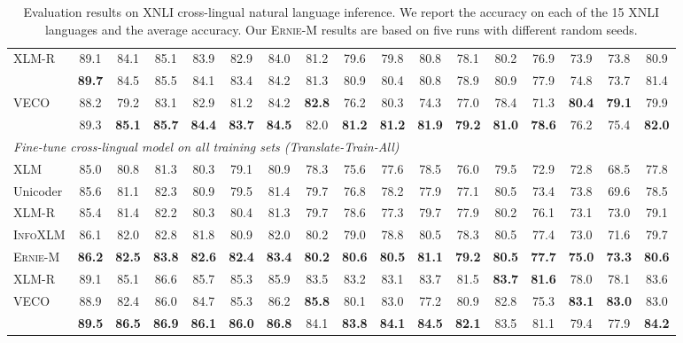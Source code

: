 \documentclass[11pt]{article}
\begin{document}
\begin{table*}[!h]
{\begin{tabular}{l|ccccccccccccccc|c}
\midrule
XLM-R \cite{conneau2019unsupervised} & 89.1 & 84.1 & 85.1 & 83.9 & 82.9 & 84.0 & 81.2 & 79.6 & 79.8 & 80.8 & 78.1 & 80.2 & 76.9 & 73.9 & 73.8 & 80.9 \\
 \cite{chi2020infoxlm} & \textbf{89.7} & 84.5 & 85.5 & 84.1 & 83.4 & 84.2 & 81.3 & 80.9 & 80.4 & 80.8 & 78.9 & 80.9 & 77.9 & 74.8 & 73.7 & 81.4 \\
VECO \cite{luo2020veco} & 88.2 & 79.2 & 83.1 & 82.9 & 81.2 & 84.2 & \textbf{82.8} & 76.2 & 80.3 & 74.3 & 77.0 & 78.4 & 71.3 & \textbf{80.4} & \textbf{79.1} & 79.9 \\
 & 89.3 & \textbf{85.1} & \textbf{85.7} & \textbf{84.4} & \textbf{83.7} & \textbf{84.5} & 82.0 & \textbf{81.2} & \textbf{81.2} & \textbf{81.9} & \textbf{79.2} & \textbf{81.0} & \textbf{78.6} & 76.2 & 75.4 & \textbf{82.0} \\

\midrule
\multicolumn{17}{l}{\textit{Fine-tune cross-lingual model on all training sets (Translate-Train-All)}} \\
\midrule
XLM \cite{lample2019cross}& 85.0 & 80.8 & 81.3 & 80.3 & 79.1 & 80.9 & 78.3 & 75.6 & 77.6 & 78.5 & 76.0 & 79.5 & 72.9 & 72.8 & 68.5 & 77.8 \\
Unicoder \cite{huang2019unicoder}& 85.6 & 81.1 & 82.3 & 80.9 & 79.5 & 81.4 & 79.7 & 76.8 & 78.2 & 77.9 & 77.1 & 80.5 & 73.4 & 73.8 & 69.6 & 78.5 \\
XLM-R \cite{conneau2019unsupervised}& 85.4 & 81.4 & 82.2 & 80.3 & 80.4 & 81.3 & 79.7 & 78.6 & 77.3 & 79.7 & 77.9 & 80.2 & 76.1 & 73.1 & 73.0 & 79.1 \\
\textsc{InfoXLM} \cite{chi2020infoxlm}& 86.1 & 82.0 & 82.8 & 81.8 & 80.9 & 82.0 & 80.2 & 79.0 & 78.8 & 80.5 & 78.3 & 80.5 & 77.4 & 73.0 & 71.6 & 79.7 \\
\textsc{Ernie-M} & \textbf{86.2} & \textbf{82.5} & \textbf{83.8} & \textbf{82.6} & \textbf{82.4} & \textbf{83.4} & \textbf{80.2} & \textbf{80.6} & \textbf{80.5} & \textbf{81.1} & \textbf{79.2} & \textbf{80.5} & \textbf{77.7} & \textbf{75.0} & \textbf{73.3} & \textbf{80.6} \\
\midrule
XLM-R \cite{conneau2019unsupervised}& 89.1 & 85.1 & 86.6 & 85.7 & 85.3 & 85.9 & 83.5 & 83.2 & 83.1 & 83.7 & 81.5 & \textbf{83.7} & \textbf{81.6} & 78.0 & 78.1 & 83.6 \\
VECO \cite{luo2020veco}& 88.9 & 82.4 & 86.0 & 84.7 & 85.3 & 86.2 & \textbf{85.8} & 80.1 & 83.0 & 77.2 & 80.9 & 82.8 & 75.3 & \textbf{83.1} & \textbf{83.0} & 83.0 \\
 & \textbf{89.5} & \textbf{86.5} & \textbf{86.9} & \textbf{86.1} & \textbf{86.0} & \textbf{86.8} & 84.1 & \textbf{83.8} & \textbf{84.1} & \textbf{84.5} & \textbf{82.1} & 83.5 & 81.1 & 79.4 & 77.9 & \textbf{84.2} \\
\bottomrule

\end{tabular}}
\caption{Evaluation results on XNLI cross-lingual natural language inference. We report the accuracy on each of the 15 XNLI languages and the average accuracy. Our \textsc{Ernie-M} results are based on five runs with different random seeds.}
\label{table1}
\vskip -0.1in
\end{table*}
\end{document}
